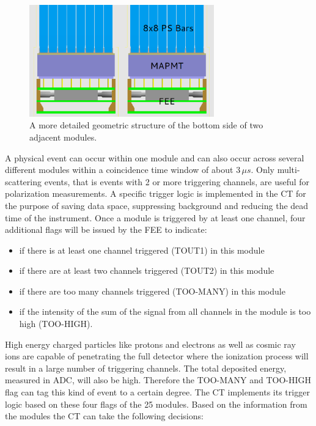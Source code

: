 \documentclass[preprint,sort&compress,12pt]{elsarticle}
\begin{document}
\begin{figure}[!ht]
\centering
\includegraphics[width=8cm]{images/twomodules.png}
\caption{A more detailed geometric structure of the bottom side of two adjacent modules.}\label{fig:modules}
\end{figure}

A physical event can occur within one module and can also occur across several different modules within a coincidence time window of about $3\,\mu s$. Only multi-scattering events, that is events with 2 or more triggering channels, are useful for polarization measurements. A specific trigger logic is implemented in the CT for the purpose of saving data space, suppressing background and reducing the dead time of the instrument. Once a module is triggered by at least one channel, four additional flags will be issued by the FEE to indicate:

\begin{itemize}
\item if there is at least one channel triggered (TOUT1) in this module
\item if there are at least two channels triggered (TOUT2) in this module
\item if there are too many channels triggered (TOO-MANY) in this module
\item if the intensity of the sum of the signal from all channels in the module is too high (TOO-HIGH).
\end{itemize}

High energy charged particles like protons and electrons as well as cosmic ray ions are capable of penetrating the full detector where the ionization process will result in a large number of triggering channels. The total deposited energy, measured in ADC, will also be high. Therefore the TOO-MANY and TOO-HIGH flag can tag this kind of event to a certain degree. The CT implements its trigger logic based on these four flags of the 25 modules. Based on the information from the modules the CT can take the following decisions:
\end{document}
